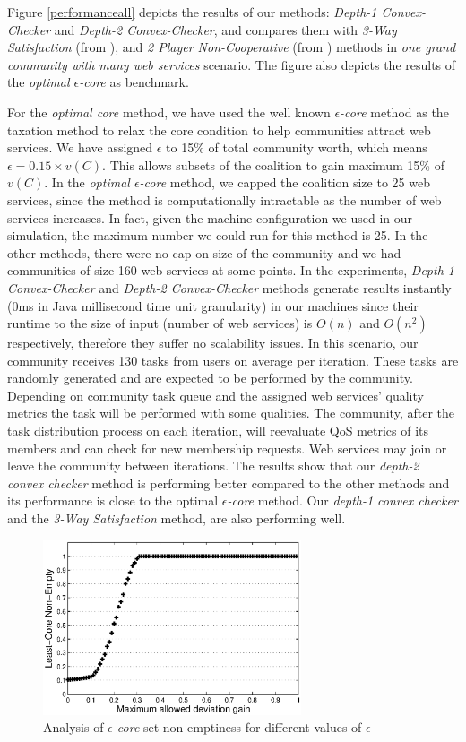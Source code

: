 \documentclass[10pt,journal,cspaper,compsoc]{IEEEtran}
\begin{document}
Figure \ref{performanceall} depicts the results of our methods:
\emph{Depth-1 Convex-Checker} and \emph{Depth-2 Convex-Checker},
and compares them with \emph{3-Way Satisfaction} (from
\cite{DBLP:conf/IEEEscc/LimTMB12}), and \emph{2 Player
Non-Cooperative} (from \cite{DBLP:conf/IEEEscc/KhosravifarABT11})
methods in \emph{one grand community with many web services}
scenario. The figure also depicts the results of the \emph{optimal
$\epsilon$-core} as benchmark.


For the \emph{optimal core} method, we have used the well known
\emph{$\epsilon$-core} method as the taxation method to relax the
core condition to help communities attract web services. We have
assigned $\epsilon$ to 15\% of total community worth, which means
$\epsilon = 0.15 \times v(C)$. This allows subsets of the
coalition to gain maximum 15\% of $v(C)$. In the \emph{optimal
$\epsilon$-core} method, we capped the coalition size to 25 web
services, since the method is computationally intractable as the
number of web services increases. In fact, given the machine
configuration we used in our simulation, the maximum number we
could run for this method is 25. In the other methods, there were
no cap on size of the community and we had communities of size 160
web services at some points. 
In the experiments, \emph{Depth-1 Convex-Checker} and \emph{Depth-2 Convex-Checker} methods generate results instantly (0ms in Java millisecond time unit granularity) in our machines since their runtime to the size of input (number of web services) is $O(n)$ and $O(n^2)$ respectively, therefore they suffer no scalability issues.
In this scenario, our community
receives 130 tasks from users on average per iteration. These tasks are randomly generated and are expected to be performed by the community. Depending on community task queue and the assigned web services' quality metrics the task will be performed with some qualities.
The community, after the task distribution process on each iteration,
will reevaluate QoS metrics of its members and can check for new
membership requests. Web services may join or leave the community
between iterations. The results show that our \emph{depth-2 convex
checker} method is performing better compared to the other methods
and its performance is close to the optimal \emph{$\epsilon$-core}
method. Our \emph{depth-1 convex checker} and the \emph{3-Way
Satisfaction} method, are also performing well.


\begin{figure}[!t]
\centering
\includegraphics[width=3in]{least_core.eps}
\caption{Analysis of \emph{$\epsilon$-core} set non-emptiness for
different values of $\epsilon$} \label{f_leastcore}
\end{figure}
\end{document}
